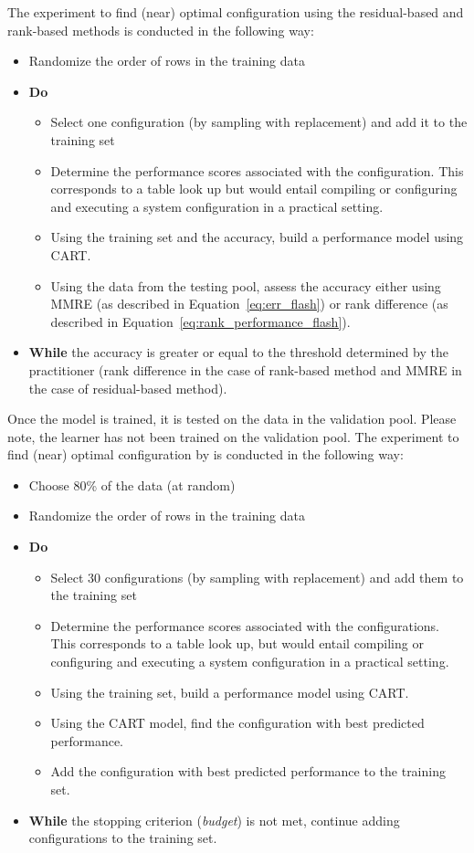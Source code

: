 The experiment to find (near) optimal configuration using the residual-based and rank-based methods is conducted in the following way:
\begin{itemize}[leftmargin=*]
    \item Randomize the order of rows  in  the training data
    \item \textbf{Do}
    \begin{itemize}
        \item Select one configuration (by sampling with replacement) and add it to the training set
        \item Determine the performance scores associated with the configuration. This corresponds to a table look up but would entail compiling or configuring and executing a system configuration in a practical setting.
        \item Using the training set and the accuracy, build a performance model using CART.
        \item Using the data from the testing pool, assess the accuracy either using MMRE (as described in Equation~\ref{eq:err_flash}) or rank difference (as described in Equation~\ref{eq:rank_performance_flash}).         
    \end{itemize}
    \item \textbf{While} the accuracy is greater or equal to the threshold determined by the practitioner (rank difference in the case of rank-based method and MMRE in the case of residual-based method).
\end{itemize}
Once the model is trained, it is tested on the data in the validation pool. Please note, the learner has not been trained on the validation pool.
The experiment to find (near) optimal configuration by \flash is conducted in the following way:
\begin{itemize}[leftmargin=*]
    \item Choose 80\% of the data (at random)
    \item Randomize the order of rows  in  the training data
    \item \textbf{Do}
    \begin{itemize}
    \item Select 30 configurations (by sampling with replacement) and add them to the training set
        \item Determine the performance scores associated with the configurations. This corresponds to  a table look up, but would entail compiling or configuring and executing a system configuration in a practical setting.
        \item Using the training set, build a performance model using CART.
        \item Using the CART model, find the configuration with best predicted performance.
        \item Add the configuration with best predicted performance to the training set.
    \end{itemize}
    \item \textbf{While} the stopping criterion (\textit{budget}) is not met, continue adding configurations to the training set.
\end{itemize}


